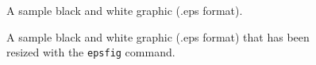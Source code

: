 \documentclass{acm_proc_article-sp}
\begin{document}
\begin{figure}
\centering
{}
\caption{A sample black and white graphic (.eps format).}
\end{figure}

\begin{figure}
\centering
{}
\caption{A sample black and white graphic (.eps format)
that has been resized with the \texttt{epsfig} command.}
\end{figure}

%

%
%

\balancecolumns
\end{document}
